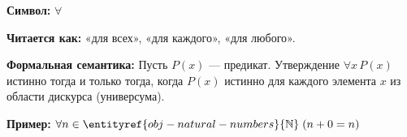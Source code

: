 

\hypertarget{term-forall}{}
\hypertarget{term-forall}{}
\begin{object} %



\textbf{Символ:} $\forall$

\textbf{Читается как:} «для всех», «для каждого», «для любого».

\textbf{Формальная семантика:}
Пусть $P(x)$ — предикат. Утверждение $\forall x\, P(x)$ истинно тогда и только тогда,
когда $P(x)$ истинно для каждого элемента $x$ из области дискурса (универсума).

\textbf{Пример:} $\forall n \in \entityref{obj-natural-numbers}{\mathbb{N}}\; (n + 0 = n)$
\end{object}